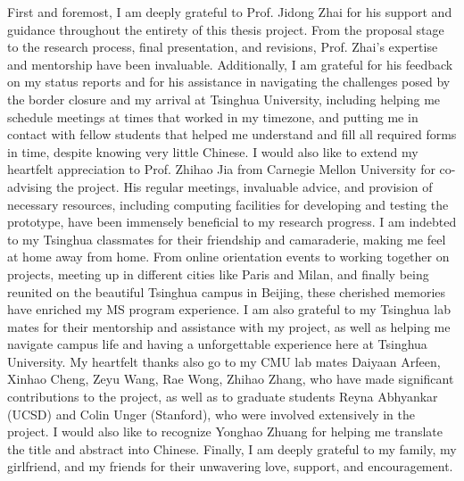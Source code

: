 
\begin{acknowledgements}

First and foremost, I am deeply grateful to Prof. Jidong Zhai for his support and guidance throughout the entirety of this thesis project. From the proposal stage to the research process, final presentation, and revisions, Prof. Zhai's expertise and mentorship have been invaluable. Additionally, I am grateful for his feedback on my status reports and for his assistance in navigating the challenges posed by the border closure and my arrival at Tsinghua University, including helping me schedule meetings at times that worked in my timezone, and putting me in contact with fellow students that helped me understand and fill all required forms in time, despite knowing very little Chinese. I would also like to extend my heartfelt appreciation to Prof. Zhihao Jia from Carnegie Mellon University for co-advising the \Project project. His regular meetings, invaluable advice, and provision of necessary resources, including computing facilities for developing and testing the \Project prototype, have been immensely beneficial to my research progress. I am indebted to my Tsinghua classmates for their friendship and camaraderie, making me feel at home away from home. From online orientation events to working together on projects, meeting up in different cities like Paris and Milan, and finally being reunited on the beautiful Tsinghua campus in Beijing, these cherished memories have enriched my MS program experience. I am also grateful to my Tsinghua lab mates for their mentorship and assistance with my project, as well as helping me navigate campus life and having a unforgettable experience here at Tsinghua University. My heartfelt thanks also go to my CMU lab mates Daiyaan Arfeen, Xinhao Cheng, Zeyu Wang, Rae Wong, Zhihao Zhang, who have made significant contributions to the project, as well as to graduate students Reyna Abhyankar (UCSD) and Colin Unger (Stanford), who were involved extensively in the project. I would also like to recognize Yonghao Zhuang for helping me translate the title and abstract into Chinese. Finally, I am deeply grateful to my family, my girlfriend, and my friends for their unwavering love, support, and encouragement.

\end{acknowledgements}
